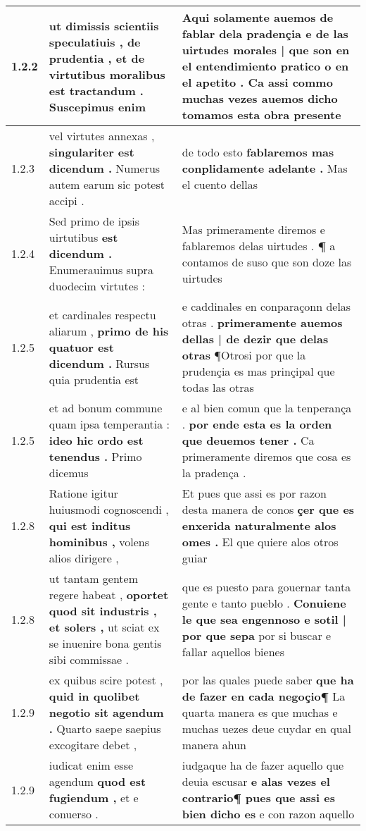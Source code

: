 \begin{tabular}{|p{1cm}|p{6.5cm}|p{6.5cm}|}
1.2.2 & ut dimissis scientiis speculatiuis , de prudentia , \textbf{ et de virtutibus moralibus est tractandum . } Suscepimus enim & Aqui solamente auemos de fablar dela pradençia \textbf{ e de las uirtudes morales | que son en el entendimiento pratico o en el apetito . } Ca assi commo muchas vezes auemos dicho tomamos esta obra presente \\\hline
1.2.3 & vel virtutes annexas , \textbf{ singulariter est dicendum . } Numerus autem earum sic potest accipi . & de todo esto \textbf{ fablaremos mas conplidamente adelante . } Mas el cuento dellas \\\hline
1.2.4 & Sed primo de ipsis uirtutibus \textbf{ est dicendum . } Enumerauimus supra duodecim virtutes : & Mas primeramente diremos e fablaremos delas uirtudes . \textbf{ ¶ } a contamos de suso que son doze las uirtudes \\\hline
1.2.5 & et cardinales respectu aliarum , \textbf{ primo de his quatuor est dicendum . } Rursus quia prudentia est & e caddinales en conparaçonn delas otras . \textbf{ primeramente auemos dellas | de dezir que delas otras } ¶Otrosi por que la prudençia es mas prinçipal que todas las otras \\\hline
1.2.5 & et ad bonum commune quam ipsa temperantia : \textbf{ ideo hic ordo est tenendus . } Primo dicemus & e al bien comun que la tenperança . \textbf{ por ende esta es la orden que deuemos tener . } Ca primeramente diremos que cosa es la pradença . \\\hline
1.2.8 & Ratione igitur huiusmodi cognoscendi , \textbf{ qui est inditus hominibus , } volens alios dirigere , & Et pues que assi es por razon desta manera de conos \textbf{ çer que es enxerida naturalmente alos omes . } El que quiere alos otros guiar \\\hline
1.2.8 & ut tantam gentem regere habeat , \textbf{ oportet quod sit industris , et solers , } ut sciat ex se inuenire bona gentis sibi commissae . & que es puesto para gouernar tanta gente e tanto pueblo . \textbf{ Conuiene le que sea engennoso e sotil | por que sepa } por si buscar e fallar aquellos bienes \\\hline
1.2.9 & ex quibus scire potest , \textbf{ quid in quolibet negotio sit agendum . } Quarto saepe saepius excogitare debet , & por las quales puede saber \textbf{ que ha de fazer en cada negoçio¶ } La quarta manera es que muchas e muchas uezes deue cuydar en qual manera ahun \\\hline
1.2.9 & iudicat enim esse agendum \textbf{ quod est fugiendum , } et e conuerso . & iudgaque ha de fazer aquello que deuia escusar \textbf{ e alas vezes el contrario¶ pues que assi es bien dicho es } e con razon aquello \\\hline

\end{tabular}

